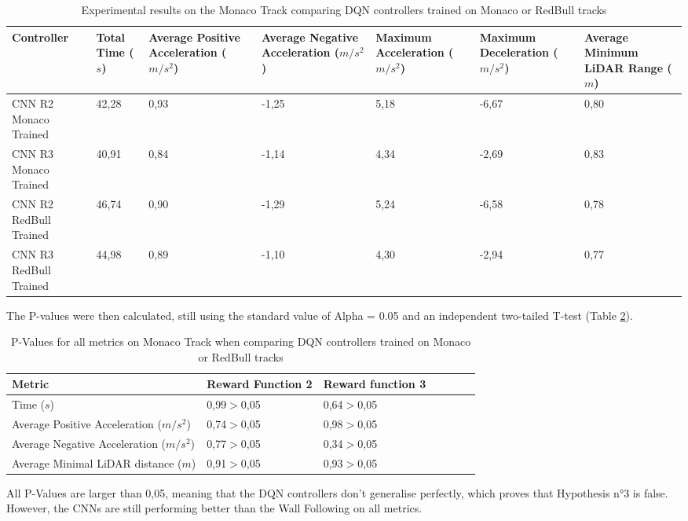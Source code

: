\begin{table}[H]
\centering
\begin{tabularx}{\textwidth}{||X|X|X|X|X|X|X||} 
\hline
 Controller & Total Time ($s$) & Average Positive Acceleration ($m/s^2$)& Average Negative Acceleration ($m/s^2$) & Maximum Acceleration ($m/s^2$) & Maximum Deceleration ($m/s^2$) & Average Minimum LiDAR Range ($m$)\\ [0.5ex] 
 \hline\hline
 CNN R2 Monaco Trained & 42,28 & 0,93 & -1,25 & 5,18 & -6,67 & 0,80\\[0.5ex] 
 \hline
 CNN R3 Monaco Trained & 40,91 & 0,84 & -1,14 & 4,34 & -2,69 & 0,83\\[0.5ex] 
 \hline
CNN R2 RedBull Trained & 46,74 & 0,90 & -1,29 & 5,24 & -6,58 & 0,78\\[0.5ex] 
 \hline
 CNN R3 RedBull Trained & 44,98 & 0,89 & -1,10 & 4,30 & -2,94 & 0,77\\[0.5ex] 
 \hline
 \end{tabularx}
\caption{Experimental results on the Monaco Track comparing DQN controllers trained on Monaco or RedBull tracks}
\label{hyp3}
\end{table}

The P-values were then calculated, still using the standard value of Alpha = 0.05 and an independent two-tailed T-test (Table \ref{pvalues}).

\begin{table}[H]
\centering
\begin{tabularx}{\textwidth}{||X|X|X|X|X|X|X||} 
\hline
 Metric & Reward Function 2 & Reward function 3\\ [0.5ex] 
 \hline\hline
Time ($s$) & 0,99$>$0,05 & 0,64$>$0,05\\[0.5ex] 
 \hline
Average Positive Acceleration ($m/s^2$) & 0,74$>$0,05 & 0,98$>$0,05\\[0.5ex] 
 \hline
 Average Negative Acceleration ($m/s^2$)  & 0,77$>$0,05 & 0,34$>$0,05\\[0.5ex] 
 \hline
 Average Minimal LiDAR distance ($m$) & 0,91$>$0,05 & 0,93$>$0,05\\[0.5ex] 
 \hline
\end{tabularx}
\caption{P-Values for all metrics on Monaco Track when comparing DQN controllers trained on Monaco or RedBull tracks}
\label{pvalues}
\end{table}

All P-Values are larger than 0,05, meaning that the DQN controllers don't generalise perfectly, which proves that Hypothesis n°3 is false. However, the CNNs are still performing better than the Wall Following on all metrics.

